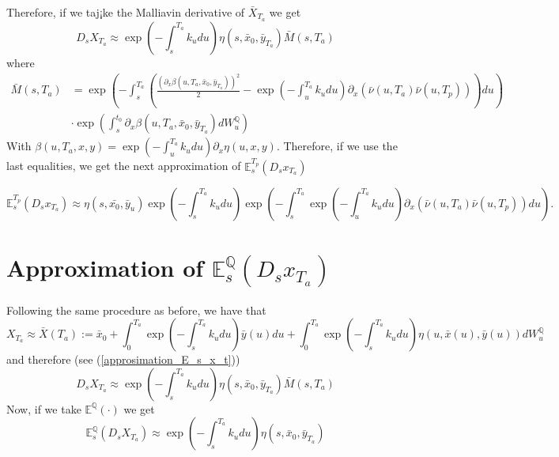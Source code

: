 \documentclass[a4paper,10pt]{article}
\newcommand{\1}{\mathbf{1}}
\begin{document}
Therefore, if we taj¡ke the Malliavin derivative of $\bar{X}_{T_a}$ we get
\begin{equation}\label{approximation_D_s_x_t}
D_sX_{T_a} \approx  \exp\left(-\int_{s}^{T_a}k_u du \right) \eta(s,\bar{x}_0,\bar{y}_{T_a})\bar{M}(s,T_a)
\end{equation}
where
\begin{align*}
\bar{M}(s,T_a) &= \exp\left(-\int_{s}^{T_a} \left( \frac{\left(\partial_x \beta(u,T_a,\bar{x}_0,\bar{y}_{T_a})\right)^{2}}{2} - \exp\left(-\int_{u}^{T_a}k_u du\right) \partial_x (\bar{\nu}(u,T_a) \bar{\nu}(u,T_p))\right) du \right) \\ 
&\cdot\exp\left(\int_{s}^{t_0} \partial_x \beta(u,T_a,\bar{x}_0,\bar{y}_{T_a}) dW^{\mathbb{Q}}_u \right)
\end{align*}
With $\beta(u,T_a,x,y) = \exp\left(-\int_{u}^{T_a}k_u du\right) \partial_x \eta(u,x,y)$. Therefore, if we use the last equalities, we get the next approximation of $\mathbb{E}_s^{T_p}\left(D_s x_{T_a}\right)$

\begin{equation}\label{approsimation_E_s_x_t}
\mathbb{E}_s^{T_p}\left(D_s x_{T_a}\right) \approx \eta(s,\bar{x_0},\bar{y}_{u}) \exp\left(-\int_{s}^{T_a}k_u du \right) \exp\left(-\int_{s}^{T_a} \exp\left(-\int_{u}^{T_a}k_u du\right)\partial_x (\bar{\nu}(u,T_a) \bar{\nu}(u,T_p)) du \right).
\end{equation}

\section{Approximation of $\mathbb{E}_s^{\mathbb{Q}}\left(D_s x_{T_a}\right)$}
Following the same procedure as before, we have that
\begin{equation*}
X_{T_a} \approx \bar{X}(T_a):= \bar{x}_0  + \int_{0}^{T_a} \exp\left(-\int_{s}^{T_a}k_u du\right) \bar{y}(u) du + \int_{0}^{T_a}  \exp\left(-\int_{s}^{T_a}k_u du \right) \eta(u,\bar{x}(u),\bar{y}(u)) dW_u^{\mathbb{Q}}  
\end{equation*}
and therefore (see (\ref{approsimation_E_s_x_t}))
\begin{equation}
D_sX_{T_a} \approx  \exp\left(-\int_{s}^{T_a}k_u du \right) \eta(s,\bar{x}_0,\bar{y}_{T_a})\bar{M}(s,T_a)
\end{equation}
Now, if we take $\mathbb{E}^{\mathbb{Q}}\left(\cdot\right)$ we get
\begin{equation}\label{approsimation_spot_E_s_x_t}
\mathbb{E}^{\mathbb{Q}}_s\left(D_sX_{T_a} \right) \approx \exp\left(-\int_{s}^{T_a}k_u du \right) \eta(s,\bar{x}_0,\bar{y}_{T_a})
\end{equation} 




%
\end{document}
